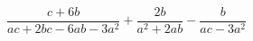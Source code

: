 \begin{ex}[type=expression]
	\begin{condition}
		\( \dfrac{c+6b}{ac+2bc-6ab-3a^2}+\dfrac{2b}{a^2+2ab}-\dfrac{b}{ac-3a^2} \)
	\end{condition}
\end{ex}